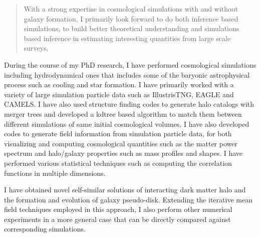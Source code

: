 \documentclass[11pt]{article}
\begin{document}
\begin{quote}
    With a strong expertise in cosmological simulations with and without galaxy formation, I primarily look forward to do both inference based simulations, to build better theoretical understanding and simulations based inference in estimating interesting quantities from large scale surveys.
\end{quote}

During the course of my PhD research, I have performed cosmological simulations including hydrodynamical ones that includes some of the baryonic astrophysical process such as cooling and star formation. I have primarily worked with a variety of large simulation particle data such as IllustrisTNG, EAGLE and CAMELS. I have also used structure finding codes to generate halo catalogs with merger trees and developed a kdtree based algorithm to match them between different simulations of same initial cosmological volumes. I have also developed codes to generate field information from simulation particle data, for both visualizing and computing cosmological quantities such as the matter power spectrum and halo/galaxy properties such as mass profiles and shapes. I have performed various statistical techniques such as computing the correlation functions in multiple dimensions. 

I have obtained novel self-similar solutions of interacting dark matter halo and the formation and evolution of galaxy pseudo-disk. Extending the iterative mean field techniques employed in this approach, I also perform other numerical experiments in a more general case that can be directly compared against corresponding simulations.



\end{document}
